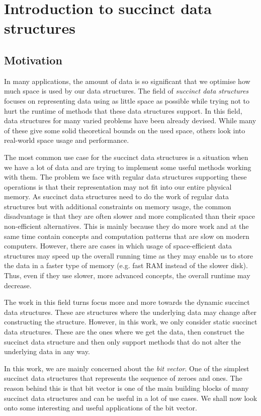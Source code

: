\chapter{Introduction to succinct data structures}
\label{kap:kap1}

\section{Motivation}

In many applications, the amount of data is so significant that we optimise how much
space is used by our data structures. The field of \textit{succinct data structures}
focuses on representing data using as little space as possible while trying not to hurt
the runtime of methods that these data structures support. In this field, data structures
for many varied problems have been already devised. While many of these give some solid
theoretical bounds on the used space, others look into real-world space usage and
performance.

The most common use case for the succinct data structures is a situation when we
have a lot of data and are trying to implement some useful methods working
with them. The problem we face with regular data structures supporting these
operations is that their representation may not fit into our entire physical
memory. As succinct data structures need to do the work of regular data structures but
with additional constraints on memory usage, the common disadvantage is that
they are often slower and more complicated than their space non-efficient
alternatives. This is mainly because they do more work and at the same time contain
concepts and computation patterns that are slow on modern computers. However, there
are cases in which usage of space-efficient data structures may speed up the overall
running time as they may enable us to store the data in a faster type of memory
(e.g. fast RAM instead of the slower disk). Thus, even if they use slower, more
advanced concepts, the overall runtime may decrease.

The work in this field turns focus more and more towards the dynamic succinct
data structures. These are structures where the underlying data may change after
constructing the structure. However, in this work, we only consider static
succinct data structures. These are the ones where we get the data, then construct
the succinct data structure and then only support methods that do not alter the
underlying data in any way.

In this work, we are mainly concerned about the \textit{bit vector}. One of the simplest
succinct data structures that represents the sequence of zeroes and ones. The reason
behind this is that bit vector is one of the main building blocks of many succinct data
structures and can be useful in a lot of use cases. We shall now look onto some interesting
and useful applications of the bit vector. 

